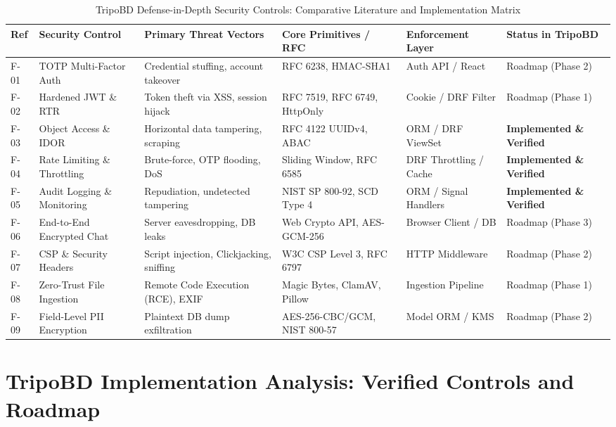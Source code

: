 \documentclass[10pt,twocolumn,a4paper]{article}
\begin{document}
\begin{table}[t]
\centering
\small
\caption{TripoBD Defense-in-Depth Security Controls: Comparative Literature and Implementation Matrix}
\label{tab:matrix}
\begin{tabularx}{\textwidth}{l p{3.2cm} p{3.6cm} p{2.4cm} l l}
\toprule
\textbf{Ref} & \textbf{Security Control} & \textbf{Primary Threat Vectors} & \textbf{Core Primitives / RFC} & \textbf{Enforcement Layer} & \textbf{Status in TripoBD} \\
\midrule
F-01 & TOTP Multi-Factor Auth & Credential stuffing, account takeover & RFC 6238, HMAC-SHA1 & Auth API / React & Roadmap (Phase 2) \\
F-02 & Hardened JWT \& RTR & Token theft via XSS, session hijack & RFC 7519, RFC 6749, HttpOnly & Cookie / DRF Filter & Roadmap (Phase 1) \\
F-03 & Object Access \& IDOR & Horizontal data tampering, scraping & RFC 4122 UUIDv4, ABAC & ORM / DRF ViewSet & \textbf{Implemented \& Verified} \\
F-04 & Rate Limiting \& Throttling & Brute-force, OTP flooding, DoS & Sliding Window, RFC 6585 & DRF Throttling / Cache & \textbf{Implemented \& Verified} \\
F-05 & Audit Logging \& Monitoring & Repudiation, undetected tampering & NIST SP 800-92, SCD Type 4 & ORM / Signal Handlers & \textbf{Implemented \& Verified} \\
F-06 & End-to-End Encrypted Chat & Server eavesdropping, DB leaks & Web Crypto API, AES-GCM-256 & Browser Client / DB & Roadmap (Phase 3) \\
F-07 & CSP \& Security Headers & Script injection, Clickjacking, sniffing & W3C CSP Level 3, RFC 6797 & HTTP Middleware & Roadmap (Phase 2) \\
F-08 & Zero-Trust File Ingestion & Remote Code Execution (RCE), EXIF & Magic Bytes, ClamAV, Pillow & Ingestion Pipeline & Roadmap (Phase 1) \\
F-09 & Field-Level PII Encryption & Plaintext DB dump exfiltration & AES-256-CBC/GCM, NIST 800-57 & Model ORM / KMS & Roadmap (Phase 2) \\
\bottomrule
\end{tabularx}
\end{table}

\section{TripoBD Implementation Analysis: Verified Controls and Roadmap}
\end{document}
